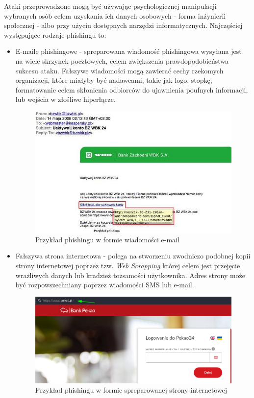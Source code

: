 \documentclass[12pt,twoside]{article}
\begin{document}
Ataki przeprowadzone mogą być używając psychologicznej manipulacji wybranych osób celem uzyskania ich danych osobowych - forma inżynierii społecznej - albo przy użyciu dostępnych narzędzi informatycznych. Najczęściej występujące rodzaje phishingu to:

\begin{itemize}
	\item E-maile phishingowe - spreparowana wiadomość phishingowa wysyłana jest na wiele skrzynek pocztowych, celem zwiększenia prawdopodobieństwa sukcesu ataku. Fałszywe wiadomości mogą zawierać cechy rzekomych organizacji, które miałyby być nadawcami, takie jak logo, stopkę, formatowanie celem skłonienia odbiorców do ujawnienia poufnych informacji, lub wejścia w złośliwe hiperłącze. \cite{PhishingEmails}
	
	\begin{figure}[H]
		\centering
		\includegraphics[width=1\linewidth]{figures/phishing-example}
		\caption{Przykład phishingu w formie wiadomości e-mail \cite{PhishingExample}}
		\label{fig:phishing-example}
		
	\end{figure}
	
	\item Fałszywa strona internetowa - polega na stworzeniu zwodniczo podobnej kopii strony internetowej poprzez tzw. \emph{Web Scrapping} \cite{WebScrapping} której celem jest przejęcie wrażliwych danych lub kradzież tożsamości użytkownika. Adres strony może być rozpowszechniany poprzez wiadomości SMS lub e-mail. \cite{WhatIsPhishing} 
	
	
	\begin{figure}[H]
		\centering
		\includegraphics[width=0.96\linewidth]{figures/phishing-example2}
		\caption{Przykład phishingu w formie spreparowanej strony internetowej}
		\label{fig:phishing-example2}
	\end{figure}
	

\end{itemize}
\end{document}
